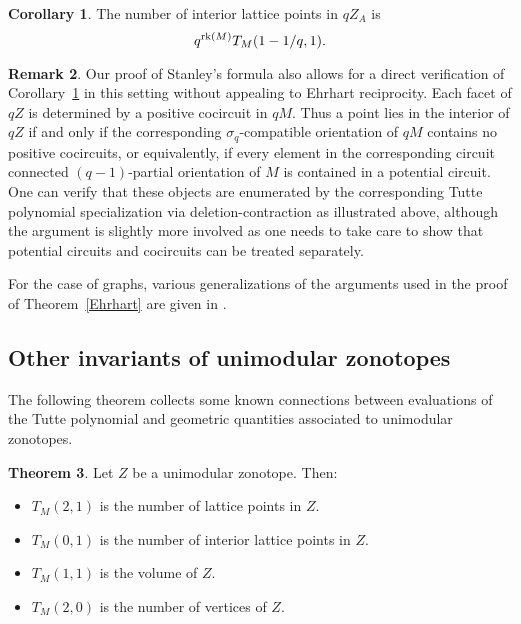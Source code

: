 \documentclass[12pt]{amsart}
\numberwithin{equation}{section}
\theoremstyle{definition}
\newtheorem{theorem}{Theorem}[subsection]
\newtheorem{corollary}[theorem]{Corollary}
\newtheorem{remark}[theorem]{Remark}
\begin{document}
 
\begin{corollary} \label{cor:reciprocity}
The number of interior lattice points in $qZ_A$ is $$q^{{\rm rk}(M)}T_{M}(1-1/q,1).$$
\end{corollary}

\begin{remark} \label{rmk:reciprocity}
 Our proof of Stanley's formula also allows for a direct verification of Corollary~\ref{cor:reciprocity} in this setting without appealing to Ehrhart reciprocity.  Each facet of $qZ$ is determined by a positive cocircuit in $qM$.  Thus a point lies in the interior of $qZ$ if and only if the corresponding $\sigma_q$-compatible orientation of $qM$ contains no positive cocircuits, or equivalently, if every element in the corresponding circuit connected $(q-1)$-partial orientation of $M$ is contained in a potential circuit.  One can verify that these objects are enumerated by the corresponding Tutte polynomial specialization via deletion-contraction as illustrated above, although the argument is slightly more involved as one needs to take care to show that potential circuits and cocircuits can be treated separately.
 
 
For the case of graphs, various generalizations of the arguments used in the proof of Theorem~\ref{Ehrhart} are given in \cite{backman2015fourientation}. 
\end{remark}

\subsection{Other invariants of unimodular zonotopes}

The following theorem collects some known connections between evaluations of the Tutte polynomial and geometric quantities associated to unimodular zonotopes.

\begin{theorem}\label{thm:Tutteevals}
Let $Z$ be a unimodular zonotope.  Then:

\begin{itemize}
    \item $T_{M}(2,1)$ is the number of lattice points in $Z$.
    
    \item $T_{M}(0,1)$ is the number of interior lattice points in $Z$.
    
    \item $T_{M}(1,1)$ is the volume of $Z$.
    
    \item $T_{M}(2,0)$ is the number of vertices of $Z$.
    
\end{itemize}

\end{theorem}
\end{document}
